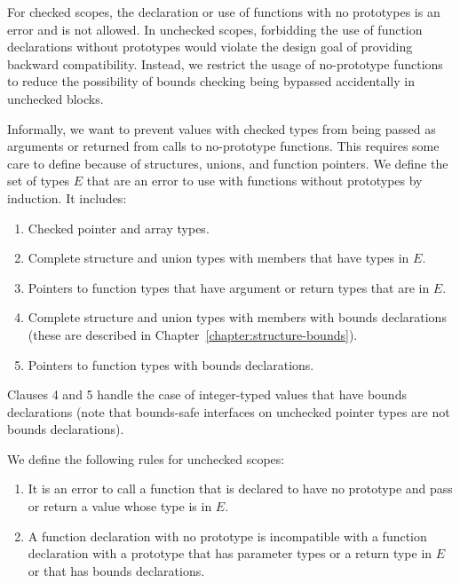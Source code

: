 For checked scopes, the declaration or use of functions with no prototypes is an error
and is not allowed.   In unchecked scopes, forbidding the use of function
declarations without prototypes would violate the design goal of providing backward compatibility.
Instead, we restrict the usage of no-prototype functions to reduce the possibility of
bounds checking being bypassed accidentally in unchecked blocks.

Informally, we want to prevent values with checked types from being passed as arguments or
returned from calls to no-prototype functions.  This requires some care to define because of
structures, unions, and function pointers. We define the set of types $E$ that are an error to use
with functions without prototypes by induction.  It includes:
\begin{enumerate}
\item Checked pointer and array types.
\item Complete structure and union types with members that have types in $E$.
\item Pointers to function types that have argument or return types that are in $E$.
\item Complete structure and union types with members with bounds declarations (these
      are described in Chapter~\ref{chapter:structure-bounds}).
\item Pointers to function types with bounds declarations.
\end{enumerate}
Clauses 4 and 5 handle the case of integer-typed values that have bounds declarations
(note that bounds-safe interfaces on unchecked pointer types are not bounds declarations).

We define the following rules for unchecked scopes:
\begin{enumerate}
\item It is an error to call a function that is
declared to have no prototype and pass or return a value whose type is in $E$.
\item A function declaration with no prototype is incompatible with a function declaration
with a prototype that has parameter types or a return type in $E$ or that has bounds
declarations.
\end{enumerate}

